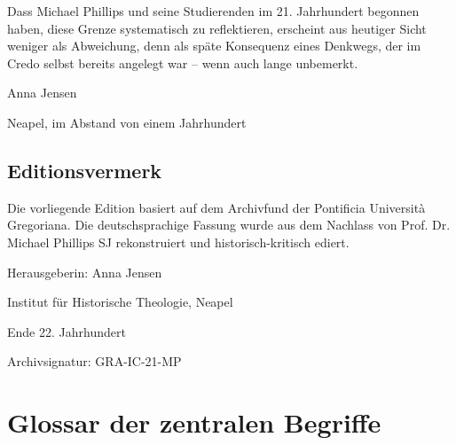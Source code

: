 \documentclass[
  ngerman,
]{article}
\begin{document}
Dass Michael Phillips und seine Studierenden im 21. Jahrhundert begonnen
haben, diese Grenze systematisch zu reflektieren, erscheint aus heutiger
Sicht weniger als Abweichung, denn als späte Konsequenz eines Denkwegs,
der im Credo selbst bereits angelegt war -- wenn auch lange unbemerkt.

Anna Jensen

Neapel, im Abstand von einem Jahrhundert

\subsection{Editionsvermerk}\label{editionsvermerk}

Die vorliegende Edition basiert auf dem Archivfund der Pontificia
Università Gregoriana. Die deutschsprachige Fassung wurde aus dem
Nachlass von Prof. Dr. Michael Phillips SJ rekonstruiert und
historisch-kritisch ediert.

Herausgeberin: Anna Jensen

Institut für Historische Theologie, Neapel

Ende 22. Jahrhundert

Archivsignatur: GRA-IC-21-MP

\section{\texorpdfstring{\hfill\break
}{ }}\label{section}

\section{Glossar der zentralen
Begriffe}\label{glossar-der-zentralen-begriffe}
\end{document}
